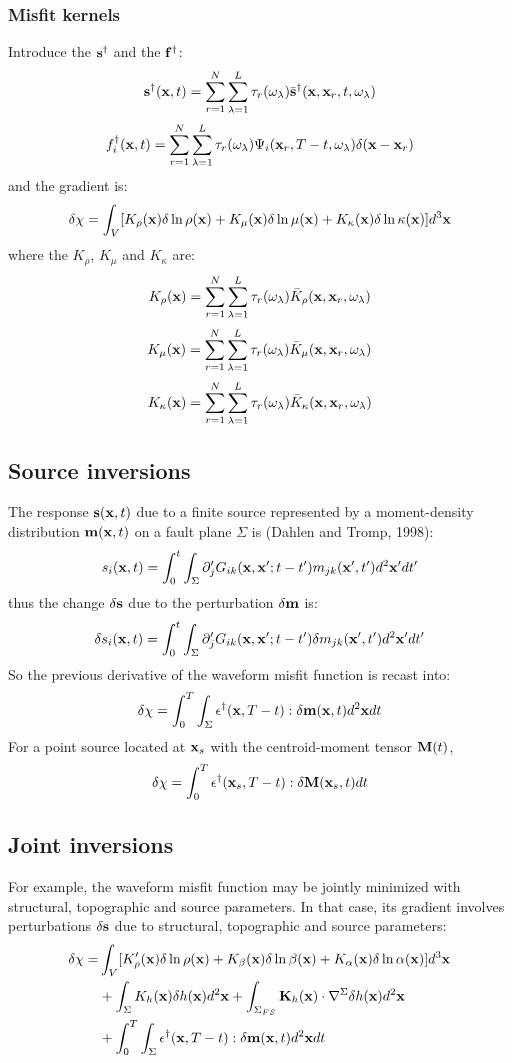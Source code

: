 \subsubsection{Misfit kernels}
Introduce the  $\mathbf{s}^\dagger$ and the  $\mathbf{f}^\dagger$:
\[ \mathbf{s}^\dagger(\mathbf{x},t)=\sum_{r=1}^N\sum_{\lambda=1}^L\tau_r(\omega_\lambda)\bar{\mathbf{s}}^\dagger(\mathbf{x},\mathbf{x}_r,t,\omega_\lambda) \]
\[ f_i^\dagger(\mathbf{x},t)=\sum_{r=1}^N\sum_{\lambda=1}^L\tau_r(\omega_\lambda)\Psi_i(\mathbf{x}_r,T-t,\omega_\lambda)\delta(\mathbf{x}-\mathbf{x}_r) \]
and the gradient is:
\[ \delta\chi=\int_V[K_\rho(\mathbf{x})\delta\ln\rho(\mathbf{x})+K_\mu(\mathbf{x})\delta\ln\mu(\mathbf{x})+K_\kappa(\mathbf{x})\delta\ln\kappa(\mathbf{x})]d^3\mathbf{x} \]
where the  $K_\rho$, $K_\mu$ and $K_\kappa$ are:
\[ K_\rho(\mathbf{x})=\sum_{r=1}^N\sum_{\lambda=1}^L\tau_r(\omega_\lambda)\bar K_\rho(\mathbf{x},\mathbf{x}_r,\omega_\lambda) \]
\[ K_\mu(\mathbf{x})=\sum_{r=1}^N\sum_{\lambda=1}^L\tau_r(\omega_\lambda)\bar K_\mu(\mathbf{x},\mathbf{x}_r,\omega_\lambda) \]
\[ K_\kappa(\mathbf{x})=\sum_{r=1}^N\sum_{\lambda=1}^L\tau_r(\omega_\lambda)\bar K_\kappa(\mathbf{x},\mathbf{x}_r,\omega_\lambda) \]\par
\subsection{Source inversions}
The response $\mathbf{s}(\mathbf{x},t)$ due to a finite source represented by a moment-density distribution $\mathbf{m}(\mathbf{x},t)$ on a fault plane $\Sigma$ is (Dahlen and Tromp, 1998):
\[ s_i(\mathbf{x},t)=\int_0^t\int_\Sigma\partial_j^\prime G_{ik}(\mathbf{x},\mathbf{x}';t-t')m_{jk}(\mathbf{x}',t')d^2\mathbf{x}'dt' \]
thus the change $\delta\mathbf{s}$ due to the perturbation $\delta\mathbf{m}$ is:
\[ \delta s_i(\mathbf{x},t)=\int_0^t\int_\Sigma\partial_j^\prime G_{ik}(\mathbf{x},\mathbf{x}';t-t')\delta m_{jk}(\mathbf{x}',t')d^2\mathbf{x}'dt' \]
So the previous \Frechet derivative of the waveform misfit function is recast into:
\[ \delta\chi=\int_0^T\int_\Sigma\mathbf{\epsilon}^\dagger(\mathbf{x},T-t):\delta\mathbf{m}(\mathbf{x},t)d^2\mathbf{x}dt \]
For a point source located at $\mathbf{x}_s$ with the centroid-moment tensor $\mathbf{M}(t)$,
\[ \delta\chi=\int_0^T\mathbf{\epsilon}^\dagger(\mathbf{x}_s,T-t):\delta\mathbf{M}(\mathbf{x}_s,t)dt \]\par
\subsection{Joint inversions}
For example, the waveform misfit function may be jointly minimized with structural, topographic and source parameters. In that case, its gradient involves perturbations $\delta\mathbf{s}$ due to structural, topographic and source parameters:
\begin{align*}
  \delta\chi= & \int_V[K_\rho^\prime(\mathbf{x})\delta\ln\rho(\mathbf{x})+K_\beta(\mathbf{x})\delta\ln\beta(\mathbf{x})+K_\alpha(\mathbf{x})\delta\ln\alpha(\mathbf{x})]d^3\mathbf{x} \\
    & +\int_\Sigma K_h(\mathbf{x})\delta h(\mathbf{x})d^2\mathbf{x}+\int_{\Sigma_{FS}}\mathbf{K}_h(\mathbf{x})\cdot\nabla^\Sigma\delta h(\mathbf{x})d^2\mathbf{x} \\
	& +\int_0^T\int_\Sigma\mathbf{\epsilon}^\dagger(\mathbf{x},T-t):\delta\mathbf{m}(\mathbf{x},t)d^2\mathbf{x}dt
\end{align*}\par
